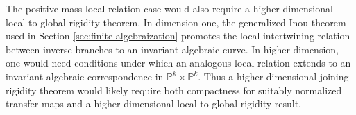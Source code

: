 \documentclass[11pt]{amsart}
\numberwithin{equation}{section}
\theoremstyle{plain}
\theoremstyle{definition}
\theoremstyle{remark}
\begin{document}
The positive-mass local-relation case would also require a higher-dimensional
local-to-global rigidity theorem. In dimension one, the generalized
Inou theorem \cite[Theorem 2.1]{JiXieLocalRigidityJuliaSets}
used in Section \ref{sec:finite-algebraization}
promotes the local intertwining relation
between inverse branches to an invariant algebraic curve. In higher
dimension, one would need conditions under which an analogous local
relation extends to an invariant algebraic correspondence in
$\mathbb P^k\times\mathbb P^k$. Thus a higher-dimensional joining
rigidity theorem would likely require both compactness for suitably normalized
transfer maps and a higher-dimensional local-to-global rigidity result.


\printbibliography
\end{document}
